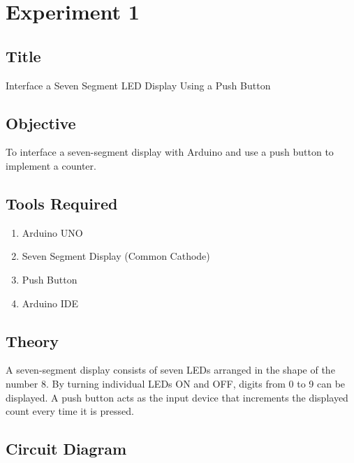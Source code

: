 \documentclass[12pt,a4paper]{report}
\begin{document}

\chapter{Experiment 1}

\section{Title}

Interface a Seven Segment LED Display Using a Push Button

\section{Objective}

To interface a seven-segment display with Arduino and use a push button to implement a counter.

\section{Tools Required}

\begin{enumerate}

\item Arduino UNO

\item Seven Segment Display (Common Cathode)

\item Push Button

\item Arduino IDE

\end{enumerate}

\section{Theory}

A seven-segment display consists of seven LEDs arranged in the shape of the number 8. By turning individual LEDs ON and OFF, digits from 0 to 9 can be displayed. A push button acts as the input device that increments the displayed count every time it is pressed.

\section{Circuit Diagram}
\end{document}
